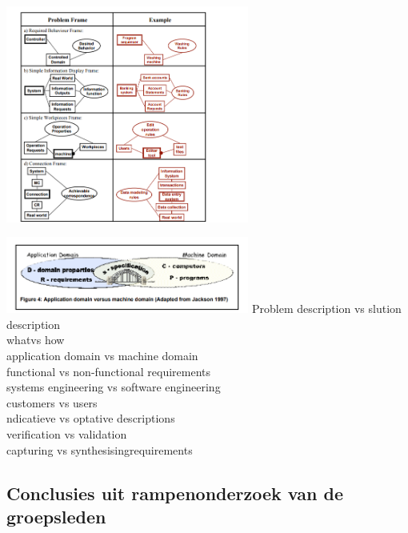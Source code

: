 \documentclass{article}
\begin{document}
				\includegraphics[width=8cm]{problemframejackson1997easterbrook.png}
				
			
					
						\includegraphics[width=8cm]{whatvshoe_easterbrook.png}
	Problem description vs slution description \\
	whatvs how \\
	application domain vs machine domain \\
	functional vs non-functional requirements \\
	systems engineering vs software engineering \\
	customers vs users \\
	ndicatieve vs optative descriptions \\
	verification vs validation \\
	capturing vs synthesisingrequirements \\
	
	\subsection{Conclusies uit rampenonderzoek van de groepsleden}
	
	
\end{document}
